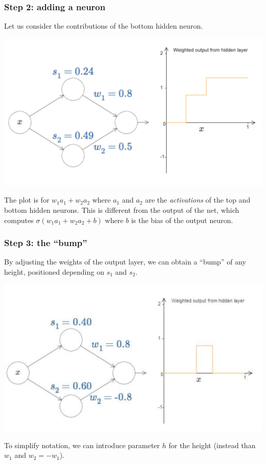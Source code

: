 \documentclass[usenames,dvipsnames]{beamer}
\begin{document}
\begin{frame}
  \frametitle{Step 2: adding a neuron}
  
  Let us consider the contributions of the bottom hidden neuron.
  
  \begin{center}
 \includegraphics[scale=.30]{more-stepf} 
 \end{center}
 
 The plot is for $w_1a_1 + w_2a_2$ where $a_1$ and $a_2$ are the \emph{activations} of the top and bottom hidden neurons. This is different from the output of the net, which computes $\sigma(w_1a_1 + w_2a_2 + b)$ where $b$ is the bias of the output neuron.
  
\end{frame}

\begin{frame}
  \frametitle{Step 3: the ``bump''}
  
  By adjusting the weights of the output layer, we can obtain a ``bump'' of any height, positioned depending on $s_1$ and $s_2$.
  
  \vfill
  
  \centering
  \includegraphics[scale=.35]{bump} 
  
  \vfill
  \flushleft
  To simplify notation, we can introduce parameter $h$ for the height (instead than $w_1$ and $w_2=-w_1$).
  
\end{frame}
\end{document}
